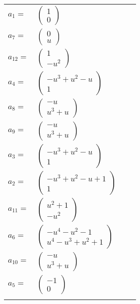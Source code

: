 \documentclass[1p]{elsarticle_modified}
\theoremstyle{definition}
\begin{document}
\begin{tabular}{m{7pt} m{180pt} m{7pt} m{180pt} }
\flushright $a_{1}=$&$\begin{pmatrix}1\\0\end{pmatrix}$ \\
\flushright $a_{7}=$&$\begin{pmatrix}0\\u\end{pmatrix}$ \\
\flushright $a_{12}=$&$\begin{pmatrix}1\\- u^2\end{pmatrix}$ \\
\flushright $a_{4}=$&$\begin{pmatrix}- u^3+u^2- u\\1\end{pmatrix}$ \\
\flushright $a_{8}=$&$\begin{pmatrix}- u\\u^3+u\end{pmatrix}$ \\
\flushright $a_{9}=$&$\begin{pmatrix}- u\\u^3+u\end{pmatrix}$ \\
\flushright $a_{3}=$&$\begin{pmatrix}- u^3+u^2- u\\1\end{pmatrix}$ \\
\flushright $a_{2}=$&$\begin{pmatrix}- u^3+u^2- u+1\\1\end{pmatrix}$ \\
\flushright $a_{11}=$&$\begin{pmatrix}u^2+1\\- u^2\end{pmatrix}$ \\
\flushright $a_{6}=$&$\begin{pmatrix}- u^4- u^2-1\\u^4- u^3+u^2+1\end{pmatrix}$ \\
\flushright $a_{10}=$&$\begin{pmatrix}- u\\u^3+u\end{pmatrix}$ \\
\flushright $a_{5}=$&$\begin{pmatrix}-1\\0\end{pmatrix}$\\&\end{tabular}
\end{document}
